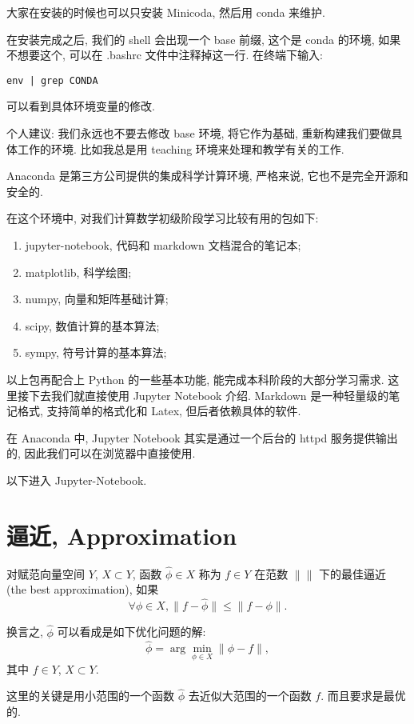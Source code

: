 \documentclass[a4paper]{ctexart}
\begin{document}
{大家在安装的时候也可以只安装 Minicoda, 然后用 conda 来维护.

在安装完成之后, 我们的 shell 会出现一个 base 前缀, 这个是 conda 的环境, 如果不想要这个,
可以在 .bashrc 文件中注释掉这一行. 在终端下输入:
\begin{verbatim}
env | grep CONDA
\end{verbatim}
可以看到具体环境变量的修改.

个人建议: 我们永远也不要去修改 base 环境, 将它作为基础, 重新构建我们要做具体工作的环境.
比如我总是用 teaching 环境来处理和教学有关的工作.

Anaconda 是第三方公司提供的集成科学计算环境, 严格来说, 它也不是完全开源和安全的.

在这个环境中, 对我们计算数学初级阶段学习比较有用的包如下:

\begin{enumerate}
\item jupyter-notebook, 代码和 markdown 文档混合的笔记本;
\item matplotlib, 科学绘图;
\item numpy, 向量和矩阵基础计算;
\item scipy, 数值计算的基本算法;
\item sympy, 符号计算的基本算法;
\end{enumerate}

以上包再配合上 Python 的一些基本功能, 能完成本科阶段的大部分学习需求.
这里接下去我们就直接使用 Jupyter Notebook 介绍. Markdown 是一种轻量级的笔记格式,
支持简单的格式化和 Latex, 但后者依赖具体的软件. 

在 Anaconda 中, Jupyter Notebook 其实是通过一个后台的 httpd 服务提供输出的,
因此我们可以在浏览器中直接使用.

以下进入 Jupyter-Notebook.

\section{逼近, Approximation}
 对赋范向量空间 $Y$, $X \subset Y$, 函数 $\hat{\phi} \in X$ 称为 $f \in Y$
在范数 $\|\|$ 下的最佳逼近 (the best approximation), 如果
$$
\forall \phi \in X, \|f - \hat{\phi}\| \leq \|f - \phi\|.
$$

换言之, $\hat{\phi}$ 可以看成是如下优化问题的解:
$$
\hat{\phi} = \arg \min_{\phi \in X} \|\phi - f\|, 
$$
其中 $f \in Y$, $X \subset Y$.

这里的关键是用小范围的一个函数 $\hat{\phi}$ 去近似大范围的一个函数 $f$. 而且要求是最优的.

}
\end{document}
